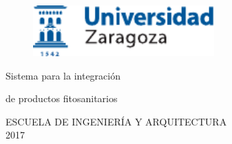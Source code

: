 \documentclass[a4paper,12pt,twoside,hidelinks,openright,openany]{report}
\begin{document}

\begin{titlepage}

\vspace*{-4mm}
\begin{figure}[!h]
  \centering
	\includegraphics[width=69.62mm]{Imagenes/UnizarLogo}
\end{figure}

\vspace*{17mm}

\fontsize{28pt}{28pt}\selectfont
\begin{center}
\setlength{\fboxsep}{3.4mm}
\end{center}

\vspace*{18.7mm}


\fontsize{20pt}{20pt}\selectfont
\begin{center}
Sistema para la integración  
\end{center}
\baselineskip 20pt
\begin{center}
de productos fitosanitarios
\end{center}

\vspace*{0cm} 
\baselineskip 36pt
\begin{center}
\fontsize{12pt}{12pt}\selectfont
{}

\vspace*{3.65mm} 
\fontsize{18pt}{18pt}\selectfont
{}
\vspace*{1cm}
\baselineskip 36pt
\fontsize{12pt}{12pt}\selectfont
{}
\vspace*{3.56mm}
\fontsize{14pt}{14pt}\selectfont
{}
\end{center}

\setcounter{footnote}{1}

\vspace*{16.45mm}
\fontsize{12pt}{12pt}\selectfont
\begin{center}
ESCUELA DE INGENIERÍA Y ARQUITECTURA\\
2017\\
\end{center}


\renewcommand{\thefootnote}{\arabic{footnote}}
\end{titlepage}
\newpage
\end{document}
